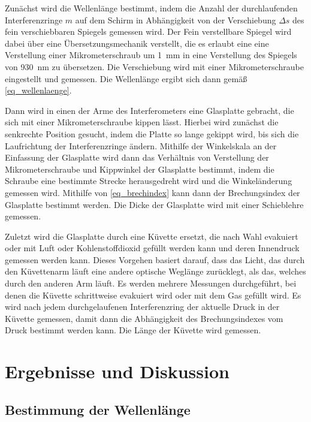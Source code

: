 \documentclass[
	a4paper,
	12pt,
	pagesize,
	ngerman
]{scrartcl}
\begin{document}
	Zunächst wird die Wellenlänge bestimmt, indem die Anzahl der durchlaufenden Interferenzringe $m$ auf dem Schirm in Abhängigkeit von der Verschiebung $\Delta s$ des fein verschiebbaren Spiegels gemessen wird.
	Der Fein verstellbare Spiegel wird dabei über eine Übersetzungsmechanik verstellt, die es erlaubt eine eine Verstellung einer Mikrometerschraub um \SI{1}{mm} in eine Verstellung des Spiegels von \SI{930}{nm} zu übersetzen.
	Die Verschiebung wird mit einer Mikrometerschraube eingestellt und gemessen.
	Die Wellenlänge ergibt sich dann gemäß \cref{eq_wellenlaenge}.

	Dann wird in einen der Arme des Interferometers eine Glasplatte gebracht, die sich mit einer Mikrometerschraube kippen lässt.
	Hierbei wird zunächst die senkrechte Position gesucht, indem die Platte so lange gekippt wird, bis sich die Laufrichtung der Interferenzringe ändern.
	Mithilfe der Winkelskala an der Einfassung der Glasplatte wird dann das Verhältnis von Verstellung der Mikrometerschraube und Kippwinkel der Glasplatte bestimmt, indem die Schraube eine bestimmte Strecke herausgedreht wird und die Winkeländerung gemessen wird.
	Mithilfe von \cref{eq_brechindex} kann dann der Brechungsindex der Glasplatte bestimmt werden.
	Die Dicke der Glasplatte wird mit einer Schieblehre gemessen.

	Zuletzt wird die Glasplatte durch eine Küvette ersetzt, die nach Wahl evakuiert oder mit Luft oder Kohlenstoffdioxid gefüllt werden kann und deren Innendruck gemessen werden kann.
	Dieses Vorgehen basiert darauf, dass das Licht, das durch den Küvettenarm läuft eine andere optische Weglänge zurücklegt, als das, welches durch den anderen Arm läuft.
	Es werden mehrere Messungen durchgeführt, bei denen die Küvette schrittweise evakuiert wird oder mit dem Gas gefüllt wird.
	Es wird nach jedem durchgelaufenen Interferenzring der aktuelle Druck in der Küvette gemessen, damit dann die Abhängigkeit des Brechungsindexes vom Druck bestimmt werden kann.
	Die Länge der Küvette wird gemessen.

	\section{Ergebnisse und Diskussion}


	\subsection{Bestimmung der Wellenlänge}
\end{document}
